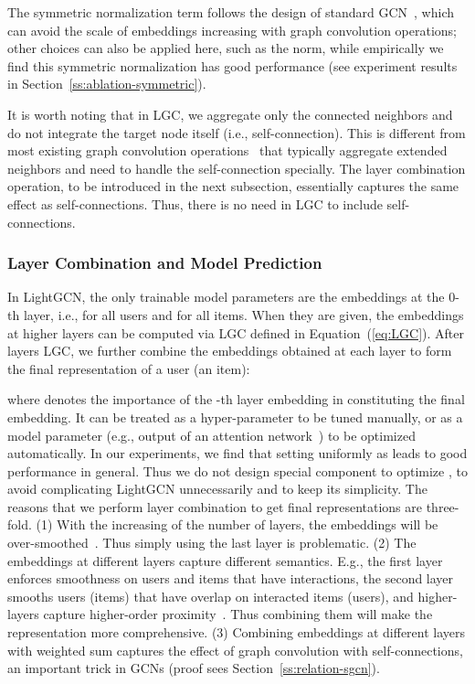 \documentclass[sigconf]{acmart}
\theoremstyle{definition}
\begin{document}
The symmetric normalization term  follows the design of standard GCN~\cite{GCN}, which can avoid the scale of embeddings increasing with graph convolution operations; other choices can also be applied here, such as the  norm, while empirically we find this symmetric normalization has good performance (see experiment results in Section~\ref{ss:ablation-symmetric}). 

It is worth noting that in LGC, we aggregate only the connected neighbors and do not integrate the target node itself (i.e., self-connection). This is different from most existing graph convolution operations~\cite{NGCF,GCN,GAT,GraphSAGE, BGNN} that typically aggregate extended neighbors and need to handle the self-connection specially. 
The layer combination operation, to be introduced in the next subsection, essentially captures the same effect as self-connections. Thus, there is no need in LGC to include self-connections. 

\subsubsection{Layer Combination and Model Prediction} In LightGCN, the only trainable model parameters are the embeddings at the 0-th layer, i.e.,  for all users and   for all items. When they are given, the embeddings at higher layers can be computed via LGC defined in Equation~(\ref{eq:LGC}). 
After  layers LGC, we further combine the embeddings obtained at each layer to form the final representation of a user (an item):

where  denotes the importance of the -th layer embedding in constituting the final embedding. 
It can be treated as a hyper-parameter to be tuned manually, or as a model parameter (e.g., output of an attention network~\cite{ACF}) to be optimized automatically. In our experiments, we find that setting  uniformly as  leads to good performance in general. Thus we do not design special component to optimize , to avoid complicating LightGCN unnecessarily and to keep its simplicity.  
The reasons that we perform layer combination to get final representations are three-fold. (1) With the increasing of the number of layers, the embeddings will be over-smoothed~\cite{DeepInsights}. Thus simply using the last layer is problematic. (2) The embeddings at different layers capture different semantics. E.g., the first layer enforces smoothness on users and items that have interactions, the second layer smooths users (items) that have overlap on interacted items (users), and higher-layers capture higher-order proximity~\cite{NGCF}. Thus combining them will make the representation more comprehensive. (3) Combining embeddings at different layers with weighted sum captures the effect of graph convolution with self-connections, an important trick in GCNs (proof sees Section~\ref{ss:relation-sgcn}).
\end{document}
